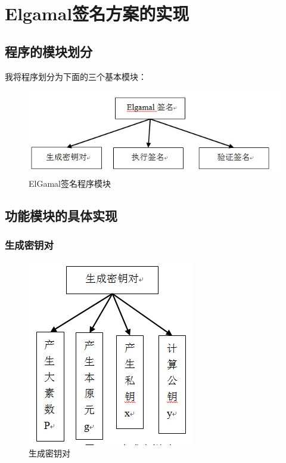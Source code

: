\section{Elgamal签名方案的实现}

\subsection{程序的模块划分}

我将程序划分为下面的三个基本模块：

\begin{figure}[H]
  \centering
  \includegraphics{img/1.jpg}
  \caption{ElGamal签名程序模块}
\end{figure}

\subsection{功能模块的具体实现}

\subsubsection{生成密钥对}

\begin{figure}[H]
  \centering
  \includegraphics{img/2.jpg}
  \caption{生成密钥对}
\end{figure}


